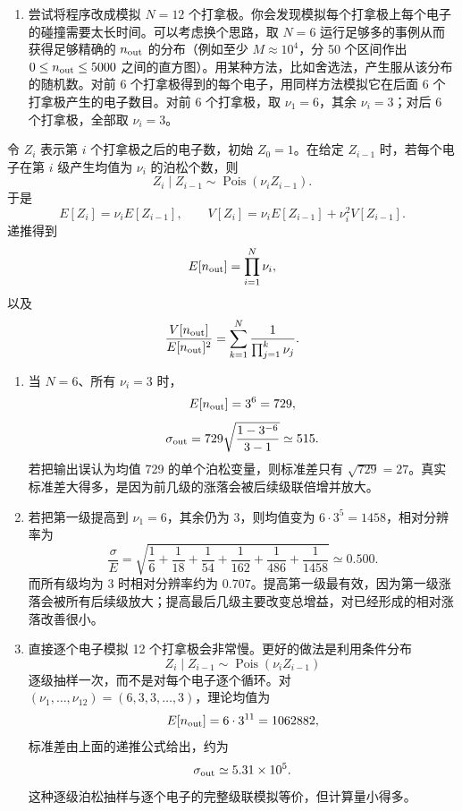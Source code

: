 \begin{question}
\begin{enumerate}
\item 尝试将程序改成模拟 \(N=12\)
个打拿极。你会发现模拟每个打拿极上每个电子的碰撞需要太长时间。可以考虑换个思路，取
\(N=6\) 运行足够多的事例从而获得足够精确的 \(n_{\rm out}\)
的分布（例如至少 \(M\approx10^4\)，分 50 个区间作出
\(0\le n_{\rm out}\le5000\)
之间的直方图）。用某种方法，比如舍选法，产生服从该分布的随机数。对前 6
个打拿极得到的每个电子，用同样方法模拟它在后面 6
个打拿极产生的电子数目。对前 6 个打拿极，取 \(\nu_1=6\)，其余
\(\nu_i=3\)；对后 6 个打拿极，全部取 \(\nu_i=3\)。
\end{enumerate}
\begin{solution}
令 \(Z_i\) 表示第 \(i\) 个打拿极之后的电子数，初始 \(Z_0=1\)。在给定
\(Z_{i-1}\) 时，若每个电子在第 \(i\) 级产生均值为 \(\nu_i\) 的泊松个数，则
\[
Z_i\mid Z_{i-1}\sim\operatorname{Pois}(\nu_i Z_{i-1}).
\]
于是
\[
E[Z_i]=\nu_iE[Z_{i-1}],
\qquad
V[Z_i]=\nu_iE[Z_{i-1}]+\nu_i^2V[Z_{i-1}].
\]
递推得到
\[
E[n_{\rm out}]=\prod_{i=1}^N\nu_i,
\]
以及
\[
\frac{V[n_{\rm out}]}{E[n_{\rm out}]^2}
=\sum_{k=1}^N\frac{1}{\prod_{j=1}^k\nu_j}.
\]
\begin{enumerate}
\item 当 \(N=6\)、所有 \(\nu_i=3\) 时，
\[
E[n_{\rm out}]=3^6=729,
\]
\[
\sigma_{\rm out}=729\sqrt{\frac{1-3^{-6}}{3-1}}\simeq515.
\]
若把输出误认为均值 729 的单个泊松变量，则标准差只有 \(\sqrt{729}=27\)。真实标准差大得多，是因为前几级的涨落会被后续级联倍增并放大。

\item 若把第一级提高到 \(\nu_1=6\)，其余仍为 3，则均值变为
\(6\cdot3^5=1458\)，相对分辨率为
\[
\frac{\sigma}{E}
=\sqrt{\frac16+\frac1{18}+\frac1{54}+\frac1{162}+\frac1{486}+\frac1{1458}}
\simeq0.500.
\]
而所有级均为 3 时相对分辨率约为 \(0.707\)。提高第一级最有效，因为第一级涨落会被所有后续级放大；提高最后几级主要改变总增益，对已经形成的相对涨落改善很小。

\item 直接逐个电子模拟 12 个打拿极会非常慢。更好的做法是利用条件分布
\[
Z_i\mid Z_{i-1}\sim\operatorname{Pois}(\nu_i Z_{i-1})
\]
逐级抽样一次，而不是对每个电子逐个循环。对
\((\nu_1,\ldots,\nu_{12})=(6,3,3,\ldots,3)\)，理论均值为
\[
E[n_{\rm out}]=6\cdot3^{11}=1062882,
\]
标准差由上面的递推公式给出，约为
\[
\sigma_{\rm out}\simeq5.31\times10^5.
\]
这种逐级泊松抽样与逐个电子的完整级联模拟等价，但计算量小得多。
\end{enumerate}
\end{solution}
\end{question}

